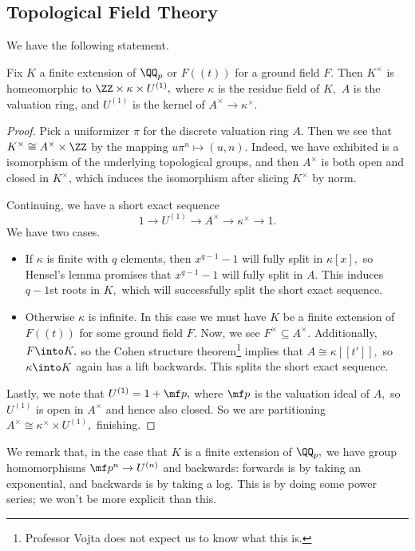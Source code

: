 \subsection{Topological Field Theory}
We have the following statement.
\begin{proposition}
	Fix $K$ a finite extension of $\QQ_p$ or $F((t))$ for a ground field $F.$ Then $K^\times$ is homeomorphic to $\ZZ\times\kappa\times U^{(1)},$ where $\kappa$ is the residue field of $K,$ $A$ is the valuation ring, and $U^{(1)}$ is the kernel of $A^\times\to\kappa^\times.$
\end{proposition}
\begin{proof}
	Pick a uniformizer $\pi$ for the discrete valuation ring $A.$ Then we see that $K^\times\cong A^\times\times\ZZ$ by the mapping $u\pi^n\mapsto(u,n).$ Indeed, we have exhibited is a isomorphism of the underlying topological groups, and then $A^\times$ is both open and closed in $K^\times$\todo{}, which induces the isomorphism after slicing $K^\times$ by norm.

	Continuing, we have a short exact sequence
	\[1\to U^{(1)}\to A^\times\to\kappa^\times\to1.\]
	We have two cases.
	\begin{itemize}
		\item If $\kappa$ is finite with $q$ elements, then $x^{q-1}-1$ will fully split in $\kappa[x],$ so Hensel's lemma promises that $x^{q-1}-1$ will fully split in $A.$ This induces $q-1$st roots in $K,$ which will successfully split the short exact sequence.
		\item Otherwise $\kappa$ is infinite. In this case we must have $K$ be a finite extension of $F((t))$ for some ground field $F.$ Now, we see $F^\times\subseteq A^\times.$ Additionally, $F\into K,$ so the Cohen structure theorem\footnote{Professor Vojta does not expect us to know what this is.} implies that $A\cong\kappa[[t']],$ so $\kappa\into K$ again has a lift backwards. This splits the short exact sequence.
	\end{itemize}
	Lastly, we note that $U^{(1)}=1+\mf p,$ where $\mf p$ is the valuation ideal of $A,$ so $U^{(1)}$ is open in $A^\times$ and hence also closed. So we are partitioning $A^\times\cong\kappa^\times\times U^{(1)},$ finishing.
\end{proof}
We remark that, in the case that $K$ is a finite extension of $\QQ_p,$ we have group homomorphisms $\mf p^n\to U^{(n)}$ and backwards: forwards is by taking an exponential, and backwards is by taking a log. This is by doing some power series; we won't be more explicit than this.